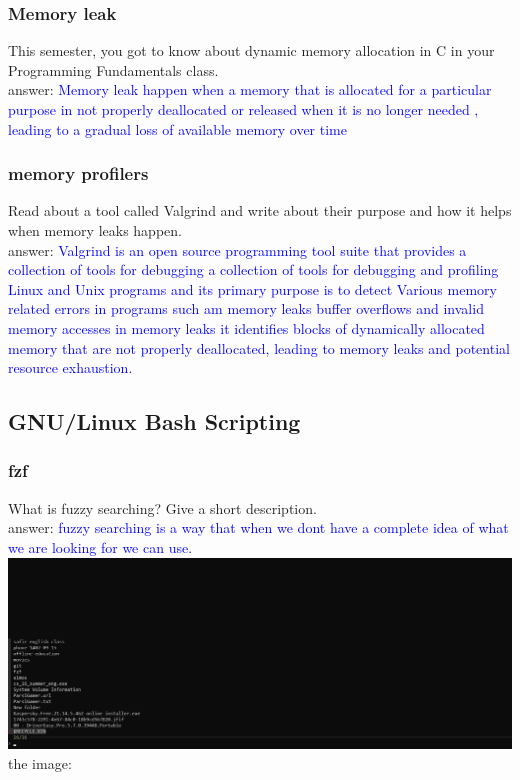 \documentclass[titlepage]{article}
\begin{document}
\subsubsection{Memory leak}
This semester, you got to know about dynamic memory allocation in C in your Programming Fundamentals class.\\ answer: 
\textcolor{blue}{Memory leak happen when a memory that is allocated for a particular purpose in not properly deallocated or released when it is no longer needed , leading to a gradual loss of available memory over time}
\subsubsection{memory profilers}
Read about a tool called Valgrind and write about their purpose and how it helps when
memory leaks happen.
\\answer: \textcolor{blue}{Valgrind is an open source programming tool suite that provides a collection of tools for debugging a collection of tools for debugging and profiling Linux and Unix programs and its primary purpose is to detect Various memory related errors in programs such am memory leaks buffer overflows and invalid memory accesses in memory leaks it identifies blocks of dynamically allocated memory that are not properly deallocated, leading to memory leaks and potential resource exhaustion.}
\subsection{GNU/Linux Bash Scripting}
\subsubsection{fzf}
What is fuzzy searching? Give a short description.\\answer: \textcolor{blue}{fuzzy searching is a way that when we dont have a complete idea of what we are looking for we can use.\\}
\includegraphics[width = 1.2\textwidth]{fzf0}
\newpage the image:
\end{document}
